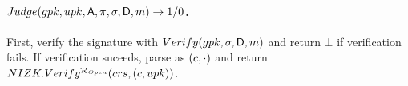 \paragraph{$Judge(gpk,upk,\mathsf{A},\pi,\sigma,\mathsf{D},m)
  \rightarrow 1/0$.} %
First, verify the signature with $Verify(gpk,\sigma,\mathsf{D},m)$ and
return $\bot$ if verification fails. If verification suceeds, parse
\sig as $(c,\cdot)$ and return $NIZK.Verify^{\mathcal{R}_{Open}}(crs,(c,
upk))$.


